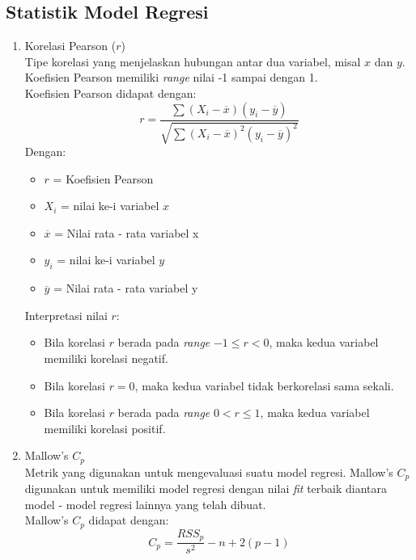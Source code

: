 \begin{enumerate}
\subsection{Statistik Model Regresi}\label{Statistik Model Regresi}
\begin{enumerate}
    \item Korelasi Pearson ($r$) \\
    Tipe korelasi yang menjelaskan hubungan antar dua variabel, misal $x$ dan $y$. Koefisien Pearson memiliki \textit{range} nilai -1 sampai dengan 1. \\
    Koefisien Pearson didapat dengan:
    \begin{equation*}
        r = \frac{\sum (X_i - \overline{x})(y_i - \overline{y})}{\sqrt{\sum (X_i - \overline{x})^2(y_i - \overline{y})^2}}
    \end{equation*}
    Dengan:
    \begin{itemize}
        \item $r$ = Koefisien Pearson
        \item $X_i$ = nilai ke-i variabel $x$
        \item $\overline{x}$ = Nilai rata - rata variabel x
        \item $y_i$ = nilai ke-i variabel $y$
        \item $\overline{y}$ = Nilai rata - rata variabel y
    \end{itemize}
    Interpretasi nilai $r$:
    \begin{itemize}
        \item Bila korelasi $r$ berada pada \textit{range} $-1 \leq r < 0$, maka kedua variabel memiliki korelasi negatif.
        \item Bila korelasi $r = 0$, maka kedua variabel tidak berkorelasi sama sekali.
        \item Bila korelasi $r$ berada pada \textit{range} $0 < r \leq 1$, maka kedua variabel memiliki korelasi positif.
    \end{itemize}
    \item Mallow's $C_p$ \\
    Metrik yang digunakan untuk mengevaluasi suatu model regresi. Mallow's $C_p$ digunakan untuk memiliki model regresi dengan nilai \textit{fit} terbaik diantara model - model regresi lainnya yang telah dibuat. \\
    Mallow's $C_p$ didapat dengan:
    \begin{equation*}
        C_p = \frac{RSS_p}{s^2} - n + 2(p-  1)
    \end{equation*}

\end{enumerate}
\end{enumerate}
